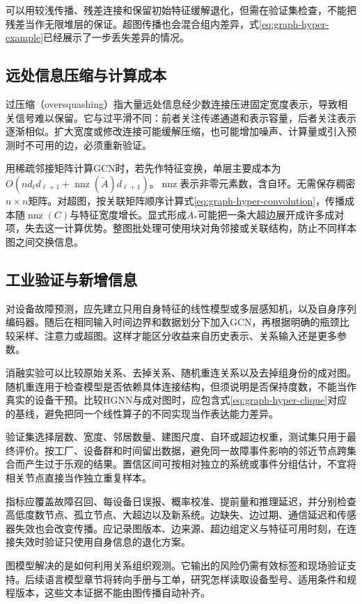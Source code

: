 可以用较浅传播、残差连接和保留初始特征缓解退化，但需在验证集检查，不能把残差当作无限堆层的保证。超图传播也会混合组内差异，式\eqref{eq:graph-hyper-example}已经展示了一步丢失差异的情况。

\subsection{远处信息压缩与计算成本}
过压缩（oversquashing）指大量远处信息经少数连接压进固定宽度表示，导致相关信号难以保留。它与过平滑不同：前者关注传递通道和表示容量，后者关注表示逐渐相似。扩大宽度或修改连接可能缓解压缩，也可能增加噪声、计算量或引入预测时不可用的边，必须重新验证。

用稀疏邻接矩阵计算GCN时，若先作特征变换，单层主要成本为$O(nd_\ell d_{\ell+1}+\operatorname{nnz}(\widetilde A)d_{\ell+1})$。$\operatorname{nnz}$表示非零元素数，含自环。无需保存稠密$n\times n$矩阵。对超图，按关联矩阵顺序计算式\eqref{eq:graph-hyper-convolution}，传播成本随$\operatorname{nnz}(C)$与特征宽度增长。显式形成$A_*$可能把一条大超边展开成许多成对项，失去这一计算优势。整图批处理可使用块对角邻接或关联结构，防止不同样本图之间交换信息。

\subsection{工业验证与新增信息}
对设备故障预测，应先建立只用自身特征的线性模型或多层感知机，以及自身序列编码器。随后在相同输入时间边界和数据划分下加入GCN，再根据明确的瓶颈比较采样、注意力或超图。这样才能区分收益来自历史表示、关系输入还是更多参数。

消融实验可以比较原始关系、去掉关系、随机重连关系以及去掉组身份的成对图。随机重连用于检查模型是否依赖具体连接结构，但须说明是否保持度数，不能当作真实的设备干预。比较HGNN与成对图时，应包含式\eqref{eq:graph-hyper-clique}对应的基线，避免把同一个线性算子的不同实现当作表达能力差异。

验证集选择层数、宽度、邻居数量、建图尺度、自环或超边权重，测试集只用于最终评价。按工厂、设备群和时间留出数据，避免同一故障事件影响的邻近节点跨集合而产生过于乐观的结果。置信区间可按相对独立的系统或事件分组估计，不宜将相关节点直接当作独立重复样本。

指标应覆盖故障召回、每设备日误报、概率校准、提前量和推理延迟，并分别检查高低度数节点、孤立节点、大超边以及新系统。边缺失、边过期、通信延迟和传感器失效也会改变传播。应记录图版本、边来源、超边组定义与特征可用时刻，在连接失效时验证只使用自身信息的退化方案。

图模型解决的是如何利用关系组织观测。它输出的风险仍需有效标签和现场验证支持。后续语言模型章节将转向手册与工单，研究怎样读取设备型号、适用条件和规程版本，这些文本证据不能由图传播自动补齐。

